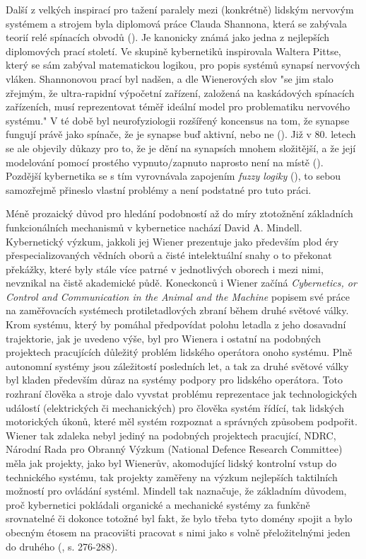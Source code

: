 \documentclass[11pt,a4paper]{article}
\begin{document}
Další z velkých inspirací pro tažení paralely mezi (konkrétně) lidským nervovým systémem a strojem byla diplomová práce Clauda Shannona, která se zabývala teorií relé spínacích obvodů (\cite*{shannon_symbolic_1938}). Je kanonicky známá jako jedna z nejlepších diplomových prací století. Ve skupině kybernetiků inspirovala Waltera Pittse, který se sám zabýval matematickou logikou, pro popis systémů synapsí nervových vláken. Shannonovou prací byl nadšen, a dle Wienerových slov "se jim stalo zřejmým, že ultra-rapidní výpočetní zařízení, založená na kaskádových spínacích zařízeních, musí reprezentovat téměř ideální model pro problematiku nervového systému." V té době byl neurofyziologii rozšířený koncensus na tom, že synapse fungují právě jako spínače, že je synapse buď aktivní, nebo ne (\cite{freedman_synapsesummary_1950, mcculloch_upper_1952, palay_synapses_1956}). Již v 80. letech se ale objevily důkazy pro to, že je dění na synapsích mnohem složitější, a že její modelování pomocí prostého vypnuto/zapnuto naprosto není na místě (\cite{pitman_versatile_1984}). Pozdější kybernetika se s tím vyrovnávala zapojením \textit{fuzzy logiky} (\cite{seising_cybernetics_2010}), to sebou samozřejmě přineslo vlastní problémy a není podstatné pro tuto práci.

Méně prozaický důvod pro hledání podobností až do míry ztotožnění základních funkcionálních mechanismů v kybernetice nachází David A. Mindell. Kybernetický výzkum, jakkoli jej Wiener prezentuje jako především plod éry přespecializovaných vědních oborů a čisté intelektuální snahy o to překonat překážky, které byly stále více patrné v jednotlivých oborech i mezi nimi, nevznikal na čistě akademické půdě. Koneckonců i Wiener začíná \textit{Cybernetics, or Control and Communication in the  Animal and the Machine} popisem své práce na zaměřovacích systémech protiletadlových zbraní během druhé světové války. Krom systému, který by pomáhal předpovídat polohu letadla z jeho dosavadní trajektorie, jak je uvedeno výše, byl pro Wienera i ostatní na podobných projektech pracujících důležitý problém lidského operátora onoho systému. Plně autonomní systémy jsou záležitostí posledních let, a tak za druhé světové války byl kladen především důraz na systémy podpory pro lidského operátora. Toto rozhraní člověka a stroje dalo vyvstat problému reprezentace jak technologických událostí (elektrických či mechanických) pro člověka systém řídící, tak lidských motorických úkonů, které měl systém rozpoznat a správných způsobem podpořit. Wiener tak zdaleka nebyl jediný na podobných projektech pracující, NDRC, Národní Rada pro Obranný Výzkum (National Defence Research Committee) měla jak projekty, jako byl Wienerův, akomodující lidský kontrolní vstup do technického systému, tak projekty zaměřeny na výzkum nejlepších taktilních možností pro ovládání systéml. Mindell tak naznačuje, že základním důvodem, proč kybernetici pokládali organické a mechanické systémy za funkčně srovnatelné či dokonce totožné byl fakt, že bylo třeba tyto domény spojit a bylo obecným étosem na pracovišti pracovat s nimi jako s volně přeložitelnými jeden do druhého (\cite{mindell_between_2002}, s. 276-288).
\end{document}
